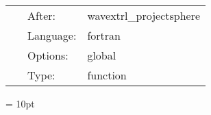 \documentclass{article}
\begin{document}
\hspace{5mm}{\it calculate schwarzschild radius and mass and spherical background } 


\hspace{5mm}

 \begin{tabular*}{160mm}{cll} 
~ & After:  & wavextrl\_projectsphere \\ 
~ & Language:  & fortran \\ 
~ & Options:  & global \\ 
~ & Type:  & function \\ 
\end{tabular*} 



\vspace{5mm}\parskip = 10pt 
\end{document}
